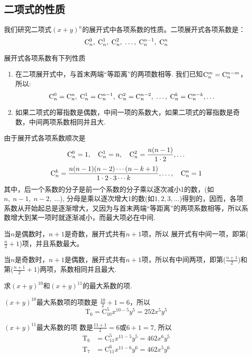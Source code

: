 \subsection{二项式的性质}

我们研究二项式$(x+y)^n$的展开式中各项系数的性质。二项展开式各项系数是：
\[{\rm C}^{0}_{n},\;{\rm C}^{1}_{n},\;{\rm C}^{2}_{n},\;\ldots,\; {\rm C}^{n-1}_{n},\;{\rm C}^{n}_{n}\]

展开式各项系数有下列性质
\begin{enumerate}
\item 在二项展开式中，与首末两端“等距离”的两项数相等. 我们已知${\rm C}^{m}_{n}={\rm C}^{n-m}_{n}$，所以:
\[{\rm C}^{0}_{n}={\rm C}^{n}_{n},\; {\rm C}^{1}_{n}={\rm C}^{n-1}_{n},\; {\rm C}^{2}_{n}={\rm C}^{n-2}_{n},\; \ldots,\; {\rm C}^{k}_{n}={\rm C}^{n-k}_{n},\ldots\]
\item 如果二项式的幂指数是偶数，中间一项的系数大，如果二项式的幂指数是奇数，中间两项系数相同并且大.
\end{enumerate}

由于展开式各项系数顺次是
\[{\rm C}^{0}_{n}=1,\quad {\rm C}^{1}_{n}=n,\quad {\rm C}^{2}_{n}=\dfrac{n(n-1)}{1\cdot 2},\ldots\]
\[{\rm C}^{k}_{n}=\dfrac{n(n-1)(n-2)\cdots(n-k+1)}{1\cdot 2\cdot 3\cdots k},\ldots,\quad {\rm C}^{n}_{n}=1\]
其中，后一个系数的分子是前一个系数的分子乘以逐次减小1的数，(如$n,\; n-1,\; n-2,\; \ldots$), 分母是乘以逐次增大1的数(如$1,2,3,\ldots$)得到的，因而，各项系数从开始起总是逐渐增大，又因为与首末两端“等距离”的两项系数相等，所以系数增大到某一项时就逐渐减小，而最大项必在中间.

当$n$是偶数时，$n+1$是奇数，展开式共有$n+1$项，所以
展开式有中间一项，即第($\frac{n}{2}+1$)项，并且系数最大。

当$n$是奇数时，$n+1$是偶数，展开式共有$n+1$项，所以有中间两项，即第($\frac{n+1}2$)和第($\frac{n+1}2+1$)两项，系数相同并且最大.

\begin{example}
    求$(x+y)^{10}$和$(x+y)^{11}$的最大系数的项.
\end{example}

\begin{solution}
    $(x+y)^{10}$最大系数项的项数是
$\frac{10}{2}+1=6$，所以
$$\mathrm{T}_{6}=\mathrm{C}_{10}^{5} x^{10-5}y^{5}=252x^{5}y^{5}$$

$(x+y)^{11}$最大系数的项 数是$\frac{11+1}{2}=6$或$6+1=7$, 所以
\[\begin{split}
    \mathrm{T}_{6}&=\mathrm{C}_{11}^{5}x^{11-5}y^{5}=462x^{6}y^{5}\\
    \mathrm{T}_{7}&=\mathrm{C}_{11}^{6}x^{11-6}y^{6}=462x^{5}y^{6}
\end{split}\]
\end{solution}

